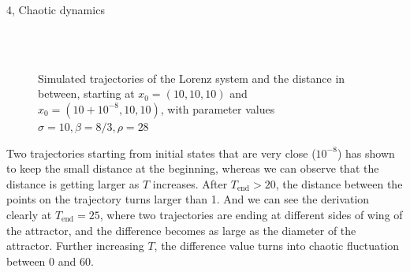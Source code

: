 \documentclass[10pt,a4paper]{article}
\begin{document}
\begin{task}{4, Chaotic dynamics}
\begin{figure} [H]
    \centering
    \\
    \\
    \caption{Simulated trajectories of the Lorenz system and the distance in between, starting at $x_0=(10, 10, 10)$ and $\hat{x}_0=(10+10^{-8}, 10, 10)$, with parameter values $\sigma=10, \beta=8/3, \rho=28$}
    \label{fig:task4-2-2}
\end{figure}

Two trajectories starting from initial states that are very close ($10^{-8}$) has shown to keep the small distance at the beginning, whereas we can observe that the distance is getting larger as $T$ increases. After $T_\text{end}>20$, the distance between the points on the trajectory turns larger than 1. And we can see the derivation clearly at $T_\text{end}=25$, where two trajectories are ending at different sides of wing of the attractor, and the difference becomes as large as the diameter of the attractor. Further increasing $T$, the difference value turns into chaotic fluctuation between 0 and 60.


\end{task}
\end{document}
